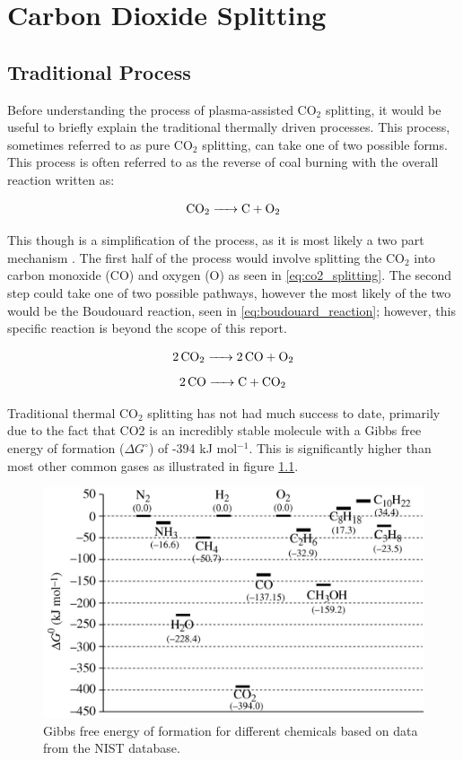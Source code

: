 \chapter{Carbon Dioxide Splitting}

\section{Traditional Process}

Before understanding the process of plasma-assisted CO$_2$ splitting, it would be useful to briefly explain the traditional thermally driven processes. This process, sometimes referred to as pure CO$_2$ splitting, can take one of two possible forms. This process is often referred to as the reverse of coal burning with the overall reaction written as:

\begin{equation}
    \ce{CO_2 -> C + O_2}
\end{equation}

This though is a simplification of the process, as it is most likely a two part mechanism \cite{rayne_2008}. The first half of the process would involve splitting the CO$_2$ into carbon monoxide (CO) and oxygen (O) as seen in \ref{eq:co2_splitting}. The second step could take one of two possible pathways, however the most likely of the two would be the Boudouard reaction, seen in \ref{eq:boudouard_reaction}; however, this specific reaction is beyond the scope of this report.

\begin{equation}
    \ce{2CO_2 -> 2CO + O_2}
    \label{eq:co2_splitting}
\end{equation}
\begin{equation}
    \ce{2CO -> C + CO_2}
    \label{eq:boudouard_reaction}
\end{equation}

Traditional thermal CO$_2$ splitting has not had much success to date, primarily due to the fact that CO2 is an incredibly stable molecule with a Gibbs free energy of formation ($\Delta G^\circ$) of -394 kJ mol$^{-1}$. This is significantly higher than most other common gases as illustrated in figure \ref{fig:co2_stability}. 

\begin{figure}[h!]
	\centering
	\includegraphics[width=0.6\linewidth]{chapter_3/figures/co2_stability.jpg}
	\caption{Gibbs free energy of formation for different chemicals based on data from the NIST database. \cite{jiang_xiao_kuznetsov_edwards_2010}}
	\label{fig:co2_stability}
\end{figure} 

